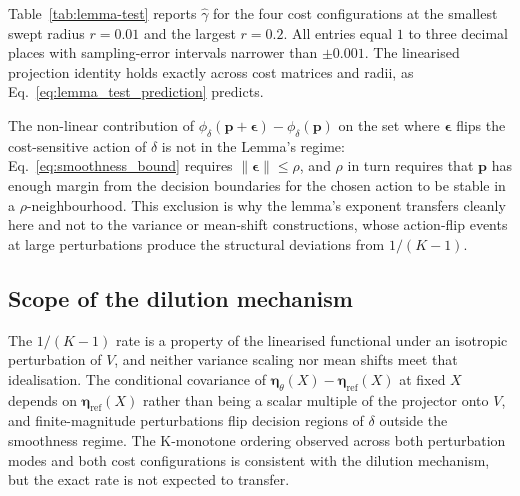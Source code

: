 \begin{table}[H]
    \centering
    
    \caption{Fitted K-decay exponent $\widehat{\gamma}$ for the four cost configurations at the smallest and largest swept perturbation radii. At each $r$, $\widehat{\gamma}$ is the negative ordinary-least-squares (OLS) slope of $\log(\mathbb{E}_\mathbf{p}\,\mathbb{E}_{\boldsymbol{\epsilon}}[(\mathbf{g}^\top \boldsymbol{\epsilon})^2] / \mathbb{E}_\mathbf{p}[\|\mathbf{g}\|^2])$ regressed against $\log(K-1)$ across $K \in \{2, 3, 4, 5, 7, 10, 15, 20\}$; bracketed intervals are normal-approximation $95\%$ CIs from the OLS slope standard error.}%
    \label{tab:lemma-test}
\end{table}

Table~\ref{tab:lemma-test} reports $\widehat{\gamma}$ for the four cost configurations at the smallest swept radius $r = 0.01$ and the largest $r = 0.2$. All entries equal $1$ to three decimal places with sampling-error intervals narrower than $\pm 0.001$. The linearised projection identity holds exactly across cost matrices and radii, as Eq.~\eqref{eq:lemma_test_prediction} predicts.

The non-linear contribution of $\phi_\delta(\mathbf{p} + \boldsymbol{\epsilon}) - \phi_\delta(\mathbf{p})$ on the set where $\boldsymbol{\epsilon}$ flips the cost-sensitive action of $\delta$ is not in the Lemma's regime: Eq.~\ref{eq:smoothness_bound} requires $\|\boldsymbol{\epsilon}\| \leq \rho$, and $\rho$ in turn requires that $\mathbf{p}$ has enough margin from the decision boundaries for the chosen action to be stable in a $\rho$-neighbourhood. This exclusion is why the lemma's exponent transfers cleanly here and not to the variance or mean-shift constructions, whose action-flip events at large perturbations produce the structural deviations from $1/(K-1)$.

\subsection{Scope of the dilution mechanism}\label{sec:misspec_sensitivity_caveats}

The $1/(K-1)$ rate is a property of the linearised functional under an isotropic perturbation of $V$, and neither variance scaling nor mean shifts meet that idealisation. The conditional covariance of $\boldsymbol{\eta}_\theta(X) - \boldsymbol{\eta}_{\mathrm{ref}}(X)$ at fixed $X$ depends on $\boldsymbol{\eta}_{\mathrm{ref}}(X)$ rather than being a scalar multiple of the projector onto $V$, and finite-magnitude perturbations flip decision regions of $\delta$ outside the smoothness regime. The K-monotone ordering observed across both perturbation modes and both cost configurations is consistent with the dilution mechanism, but the exact rate is not expected to transfer.

